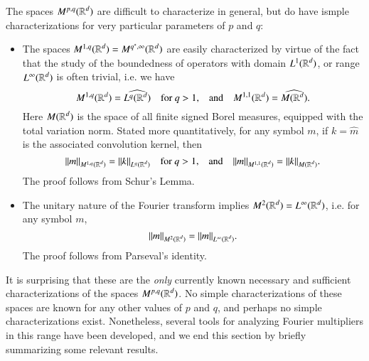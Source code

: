 The spaces $M^{p,q}(\operatorname{\mathbb{R}}^d)$ are difficult to characterize in general, but do have ismple characterizations for very particular parameters of $p$ and $q$:
%
\begin{itemize}
    \item The spaces $M^{1,q}(\operatorname{\mathbb{R}}^d) = M^{q^*,\infty}(\operatorname{\mathbb{R}}^d)$ are easily characterized by virtue of the fact that the study of the boundedness of operators with domain $L^1(\operatorname{\mathbb{R}}^d)$, or range $L^\infty(\operatorname{\mathbb{R}}^d)$ is often trivial, i.e. we have
    \[ M^{1,q}(\operatorname{\mathbb{R}}^d) = \widehat{L^q(\operatorname{\mathbb{R}}^d)} \quad\text{for $q > 1$,}\quad \text{and}\quad M^{1,1}(\operatorname{\mathbb{R}}^d) = \widehat{M(\operatorname{\mathbb{R}}^d)}. \]
    Here $M(\operatorname{\mathbb{R}}^d)$ is the space of all finite signed Borel measures, equipped with the total variation norm. Stated more quantitatively, for any symbol $m$, if $k = \widehat{m}$ is the associated convolution kernel, then
    \[ \| m \|_{M^{1,q}(\operatorname{\mathbb{R}}^d)} = \| k \|_{L^q(\operatorname{\mathbb{R}}^d)}\quad\text{for $q > 1$,}\quad \text{and}\quad \| m \|_{M^{1,1}(\operatorname{\mathbb{R}}^d)} = \| k \|_{M(\operatorname{\mathbb{R}}^d)}. \]
    The proof follows from Schur's Lemma.

    \item The unitary nature of the Fourier transform implies $M^2(\operatorname{\mathbb{R}}^d) = L^\infty(\operatorname{\mathbb{R}}^d)$, i.e. for any symbol $m$,
    \[ \| m \|_{M^2(\operatorname{\mathbb{R}}^d)} = \| m \|_{L^\infty(\operatorname{\mathbb{R}}^d)}. \]
    The proof follows from Parseval's identity.
\end{itemize}
%
It is surprising that these are the \emph{only} currently known necessary and sufficient characterizations of the spaces $M^{p,q}(\operatorname{\mathbb{R}}^d)$. No simple characterizations of these spaces are known for any other values of $p$ and $q$, and perhaps no simple characterizations exist. Nonetheless, several tools for analyzing Fourier multipliers in this range have been developed, and we end this section by briefly summarizing some relevant results.

